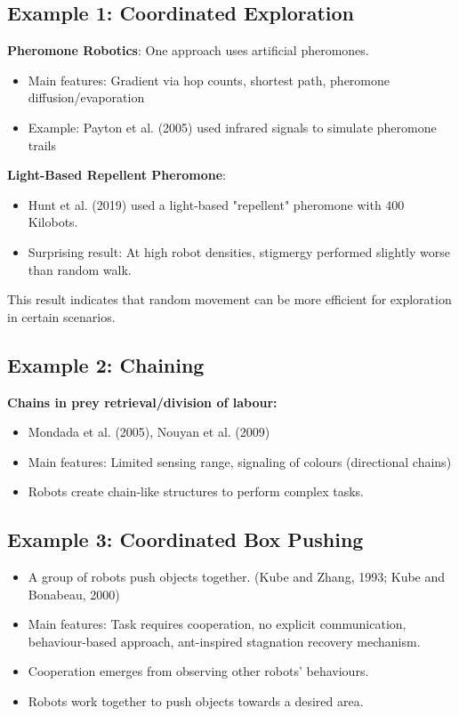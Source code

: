 \subsection*{Example 1: Coordinated Exploration}
\textbf{Pheromone Robotics}: One approach uses artificial pheromones.
\begin{itemize}
    \item Main features: Gradient via hop counts, shortest path, pheromone diffusion/evaporation
    \item Example: Payton et al. (2005) used infrared signals to simulate pheromone trails
\end{itemize}
\textbf{Light-Based Repellent Pheromone}:
\begin{itemize}
    \item Hunt et al. (2019) used a light-based "repellent" pheromone with 400 Kilobots.
    \item Surprising result: At high robot densities, stigmergy performed slightly worse than random walk.
\end{itemize}
This result indicates that random movement can be more efficient for exploration in certain scenarios.

\subsection*{Example 2: Chaining}
\textbf{Chains in prey retrieval/division of labour:}
\begin{itemize}
    \item  Mondada et al. (2005), Nouyan et al. (2009)
    \item Main features: Limited sensing range, signaling of colours (directional chains)
    \item Robots create chain-like structures to perform complex tasks.
\end{itemize}

\subsection*{Example 3: Coordinated Box Pushing}
\begin{itemize}
    \item A group of robots push objects together. (Kube and Zhang, 1993; Kube and Bonabeau, 2000)
    \item Main features: Task requires cooperation, no explicit communication, behaviour-based approach, ant-inspired stagnation recovery mechanism.
    \item Cooperation emerges from observing other robots' behaviours.
    \item Robots work together to push objects towards a desired area.
\end{itemize}


